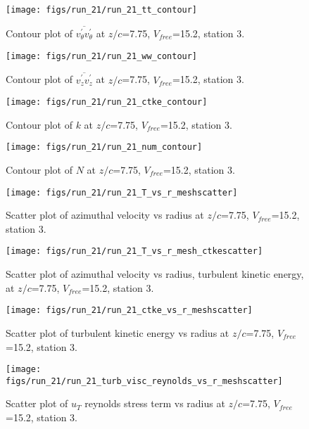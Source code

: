 \begin{figure}[H]
\centering
\texttt{[image: figs/run\_21/run\_21\_tt\_contour]}
\caption{Contour plot of $\overline{v_{\theta}^{\prime} v_{\theta}^{\prime}}$ at $z/c$=7.75, $V_{free}$=15.2, station 3.}
\end{figure}


\begin{figure}[H]
\centering
\texttt{[image: figs/run\_21/run\_21\_ww\_contour]}
\caption{Contour plot of $\overline{v_{z}^{\prime} v_{z}^{\prime}}$ at $z/c$=7.75, $V_{free}$=15.2, station 3.}
\end{figure}


\begin{figure}[H]
\centering
\texttt{[image: figs/run\_21/run\_21\_ctke\_contour]}
\caption{Contour plot of $k$ at $z/c$=7.75, $V_{free}$=15.2, station 3.}
\end{figure}


\begin{figure}[H]
\centering
\texttt{[image: figs/run\_21/run\_21\_num\_contour]}
\caption{Contour plot of $N$ at $z/c$=7.75, $V_{free}$=15.2, station 3.}
\end{figure}


\begin{figure}[H]
\centering
\texttt{[image: figs/run\_21/run\_21\_T\_vs\_r\_meshscatter]}
\caption{Scatter plot of azimuthal velocity vs radius at $z/c$=7.75, $V_{free}$=15.2, station 3.}
\end{figure}


\begin{figure}[H]
\centering
\texttt{[image: figs/run\_21/run\_21\_T\_vs\_r\_mesh\_ctkescatter]}
\caption{Scatter plot of azimuthal velocity vs radius, turbulent kinetic energy, at $z/c$=7.75, $V_{free}$=15.2, station 3.}
\end{figure}


\begin{figure}[H]
\centering
\texttt{[image: figs/run\_21/run\_21\_ctke\_vs\_r\_meshscatter]}
\caption{Scatter plot of turbulent kinetic energy vs radius at $z/c$=7.75, $V_{free}$=15.2, station 3.}
\end{figure}


\begin{figure}[H]
\centering
\texttt{[image: figs/run\_21/run\_21\_turb\_visc\_reynolds\_vs\_r\_meshscatter]}
\caption{Scatter plot of $
u_T$ reynolds stress term vs radius at $z/c$=7.75, $V_{free}$=15.2, station 3.}
\end{figure}


